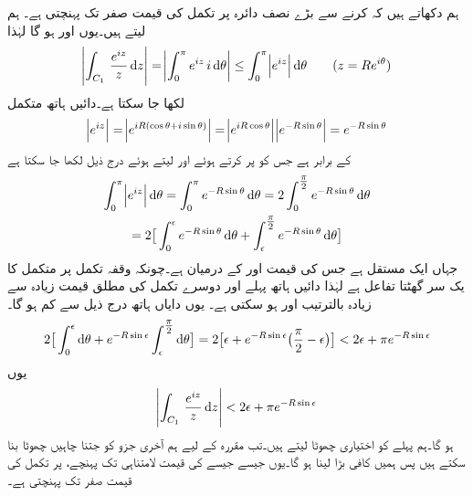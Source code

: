 ہم دکھاتے ہیں کہ  کرنے سے بڑے نصف دائرہ  پر  تکمل کی قیمت صفر تک پہنچتی ہے۔ ہم  لیتے ہیں۔یوں  اور  ہو گا لہٰذا
\begin{align*}
\abs{\int_{C_1} \,\frac{e^{iz}}{z}\dif z}=\abs{\int_0^{\pi} e^{iz} \,i\dif \theta}\le \int_0^{\pi} \abs{e^{iz}}\dif \theta\quad\quad (z=Re^{i\theta})
\end{align*}
لکھا جا سکتا ہے۔دائیں ہاتھ متکمل
\begin{align*}
\abs{e^{iz}}=\abs{e^{iR(\cos\theta+i\sin\theta)}}=\abs{e^{iR\cos\theta}}\abs{e^{-R\sin\theta}}=e^{-R\sin\theta}
\end{align*}
کے برابر ہے جس کو پر کرتے ہوئے اور   لیتے ہوئے درج ذیل لکھا جا سکتا ہے
\begin{multline*}
\int_0^{\pi}\abs{e^{iz}}\dif\theta=\int_0^{\pi} e^{-R\sin\theta}\dif\theta=2\int_0^{\tfrac{\pi}{2}} e^{-R\sin\theta}\dif\theta\\
=2\big[\int_0^{\epsilon} e^{-R\sin\theta}\dif \theta+\int_{\epsilon}^{\tfrac{\pi}{2}}e^{-R\sin\theta}\dif \theta\big]
\end{multline*}
جہاں  ایک مستقل ہے جس کی قیمت  اور   کے درمیان ہے۔چونکہ وقفہ تکمل پر متکمل  کا یک سر گھٹتا تفاعل ہے لہٰذا دائیں ہاتھ پہلے اور دوسرے تکمل کی مطلق قیمت زیادہ سے زیادہ  بالترتیب  اور  ہو سکتی ہے۔ یوں دایاں ہاتھ درج ذیل سے کم ہو گا۔
\begin{align*}
2\big[\int_0^{\epsilon} \dif \theta+e^{-R\sin\epsilon}\int_{\epsilon}^{\tfrac{\pi}{2}} \dif\theta\big]=2\big[\epsilon+e^{-R\sin\epsilon}\big(\frac{\pi}{2}-\epsilon\big)\big]<2\epsilon+\pi e^{-R\sin\epsilon}
\end{align*}
یوں
\begin{align*}
\abs{\int_{C_1} \,\frac{e^{iz}}{z}\dif z}<2\epsilon+\pi e^{-R\sin\epsilon}
\end{align*}
ہو گا۔ہم پہلے  کو اختیاری چھوٹا لیتے ہیں۔تب مقررہ  کے لیے ہم آخری جزو  کو جتنا چاہیں چھوٹا بنا سکتے ہیں پس ہمیں  کافی بڑا لینا ہو گا۔یوں  جیسے جیسے  کی قیمت لامتناہی تک پہنچے،  پر تکمل کی قیمت صفر تک پہنچتی ہے۔

